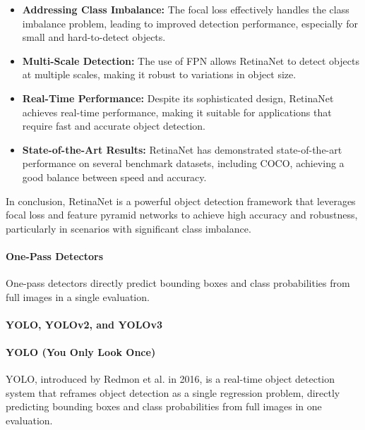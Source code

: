 \documentclass[12pt]{article}
\begin{document}
\begin{itemize}
    \item \textbf{Addressing Class Imbalance:} The focal loss effectively handles the class imbalance problem, leading to improved detection performance, especially for small and hard-to-detect objects.
    
    \item \textbf{Multi-Scale Detection:} The use of FPN allows RetinaNet to detect objects at multiple scales, making it robust to variations in object size.
    
    \item \textbf{Real-Time Performance:} Despite its sophisticated design, RetinaNet achieves real-time performance, making it suitable for applications that require fast and accurate object detection.
    
    \item \textbf{State-of-the-Art Results:} RetinaNet has demonstrated state-of-the-art performance on several benchmark datasets, including COCO, achieving a good balance between speed and accuracy.
\end{itemize}

In conclusion, RetinaNet is a powerful object detection framework that leverages focal loss and feature pyramid networks to achieve high accuracy and robustness, particularly in scenarios with significant class imbalance.

\paragraph{One-Pass Detectors}

One-pass detectors directly predict bounding boxes and class probabilities from full images in a single evaluation.

\paragraph{YOLO, YOLOv2, and YOLOv3}

\paragraph{YOLO (You Only Look Once)}

YOLO, introduced by Redmon et al. in 2016, is a real-time object detection system that reframes object detection as a single regression problem, directly predicting bounding boxes and class probabilities from full images in one evaluation.
\end{document}
